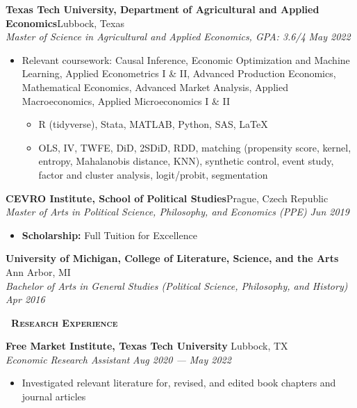 \documentclass[a4paper,11pt]{article}
\newcommand{\header} [1] {
    \vspace{1mm}
    {\textsc{\textbf{\Large{\xrfill[0.5ex]{0.5pt}~#1~\xrfill[0.5ex]{0.5pt}}}}} %
}
\begin{document}
\vspace{1mm}
\textbf{Texas Tech University, Department of Agricultural and Applied Economics}\hfill Lubbock, Texas\\
\textit{Master of Science in Agricultural and Applied Economics, GPA: 3.6/4} \hfill  \textit{May 2022}
\begin{itemize}
    \item Relevant coursework: Causal Inference, Economic Optimization and Machine Learning, Applied Econometrics I \& II, Advanced Production Economics, Mathematical Economics, Advanced Market Analysis, Applied Macroeconomics, Applied Microeconomics I \& II
    \begin{itemize}
        \item R (tidyverse), Stata, MATLAB, Python, SAS, \LaTeX
        \item OLS, IV, TWFE, DiD, 2SDiD, RDD, matching (propensity score, kernel, entropy, Mahalanobis distance,  KNN), synthetic control, event study, factor and cluster analysis, logit/probit, segmentation
    \end{itemize}
\end{itemize}
\vspace{1mm}

\textbf{CEVRO Institute, School of Political Studies}\hfill Prague, Czech Republic\\
\textit{Master of Arts in Political Science, Philosophy, and Economics (PPE)} \hfill  \textit{Jun 2019}
\begin{itemize}
    \item \textbf{Scholarship:} Full Tuition for Excellence
\end{itemize}
\vspace{1mm}

\textbf{University of Michigan, College of Literature, Science, and the Arts} \hfill Ann Arbor, MI\\
\textit{Bachelor of Arts in General Studies (Political Science, Philosophy, and History)} \hfill  \textit{Apr 2016}

\vspace{1mm}

\header{Research Experience} 

\vspace{1mm}
\textbf{Free Market Institute, Texas Tech University} \hfill Lubbock, TX\\
\textit{Economic Research Assistant} \hfill  \textit{Aug 2020 --- May 2022} 
\begin{itemize}
    \item Investigated relevant literature for, revised, and edited book chapters and journal articles
\end{itemize}
\vspace{1mm}
\end{document}
